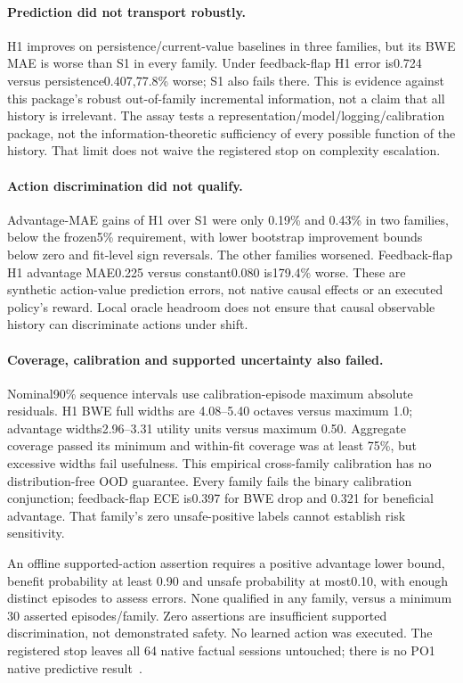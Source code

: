 \documentclass[10pt]{article}
\begin{document}
\POOneTable

\paragraph{Prediction did not transport robustly.}
H1 improves on persistence/current-value baselines in three families, but its BWE
MAE is worse than S1 in every family. Under feedback-flap H1 error is0.724 versus
persistence0.407,77.8\% worse; S1 also fails there. This is evidence against this
package's robust out-of-family incremental information, not a claim that all
history is irrelevant.
The assay tests a representation/model/logging/calibration package, not the
information-theoretic sufficiency of every possible function of the history.
That limit does not waive the registered stop on complexity escalation.

\paragraph{Action discrimination did not qualify.}
Advantage-MAE gains of H1 over S1 were only 0.19\% and 0.43\% in two families,
below the frozen5\% requirement, with lower bootstrap improvement bounds below
zero and fit-level sign reversals. The other families worsened. Feedback-flap
H1 advantage MAE0.225 versus constant0.080 is179.4\% worse. These are synthetic
action-value prediction errors, not native causal effects or an executed
policy's reward. Local oracle headroom does not ensure that causal observable
history can discriminate actions under shift.

\paragraph{Coverage, calibration and supported uncertainty also failed.}
Nominal90\% sequence intervals use calibration-episode maximum absolute
residuals. H1 BWE full widths are 4.08--5.40 octaves versus maximum 1.0; advantage
widths2.96--3.31 utility units versus maximum 0.50. Aggregate coverage passed its
minimum and within-fit coverage was at least 75\%, but excessive widths fail
usefulness. This empirical cross-family calibration has no distribution-free
OOD guarantee. Every family fails the binary calibration conjunction;
feedback-flap ECE is0.397 for BWE drop and 0.321 for beneficial advantage.
That family's zero unsafe-positive labels cannot establish risk sensitivity.

An offline supported-action assertion requires a positive advantage lower bound,
benefit probability at least 0.90 and unsafe probability at most0.10, with enough
distinct episodes to assess errors. None qualified in any family, versus a
minimum 30 asserted episodes/family. Zero assertions are insufficient supported
discrimination, not demonstrated safety. No learned action was executed. The
registered stop leaves all 64 native factual sessions untouched; there is no PO1
native predictive result~\cite{po1}.
\end{document}
